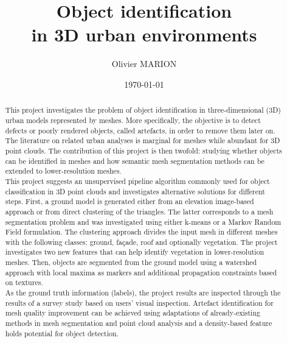\documentclass{kththesis}
\title{Object identification \\ in 3D urban environments}
\author{Olivier MARION}
\date{\today}
\begin{document}
\frontmatter

\titlepage

\begin{abstract}
This project investigates the problem of object identification in three-dimensional (3D) urban models represented by meshes. More specifically, the objective is to detect defects or poorly rendered objects, called artefacts, in order to remove them later on. 
The literature on related urban analyses is marginal for meshes while abundant for 3D point clouds. The contribution of this project is then twofold: studying whether objects can be identified in meshes and how semantic mesh segmentation methods can be extended to lower-resolution meshes. \\
This project suggests an unsupervised pipeline algorithm commonly used for object classification in 3D point clouds and investigates alternative solutions for  different steps. First, a ground model is generated either from an elevation image-based approach or from direct clustering of the triangles. The latter corresponds to a mesh segmentation problem and was investigated using either k-means or a Markov Random Field formulation. The clustering approach divides the input mesh in different meshes with the following classes: ground, façade, roof and optionally vegetation. The project investigates two new features that can help identify vegetation in lower-resolution meshes. Then, objects are segmented from the ground model using a watershed approach with local maxima as markers and additional propagation constraints based on textures.  \\
As the ground truth information (labels), the project results are inspected through the results of a survey study based on users' visual inspection. Artefact identification for mesh quality improvement can be achieved using adaptations of already-existing methods in mesh segmentation and point cloud analysis and a density-based feature holds potential for object detection. 

  

\end{abstract}
\end{document}
